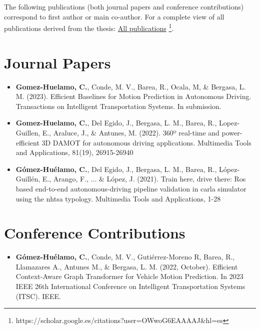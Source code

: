 \begin{refsection}

The following publications (both journal papers and conference contributions) correspond to first author or main co-author. For a complete view of all publications derived from the thesis: \href{https://scholar.google.es/citations?user=OWwoG6EAAAAJ\&hl=es}{All publications} \footnote{https://scholar.google.es/citations?user=OWwoG6EAAAAJ\&hl=es}.

\section*{Journal Papers}

\begin{itemize}

\item \textbf{Gomez-Huelamo, C.}, Conde, M. V., Barea, R., Ocala, M, \& Bergasa, L. M. (2023). Efficient Baselines for Motion Prediction in Autonomous Driving. Transactions on Intelligent Transportation Systems. In submission.

\item \textbf{Gomez-Huelamo, C.}, Del Egido, J., Bergasa, L. M., Barea, R., Lopez-Guillen, E., Araluce, J., \& Antunes, M. (2022). 360º real-time and power-efficient 3D DAMOT for autonomous driving applications. Multimedia Tools and Applications, 81(19), 26915-26940

\item \textbf{Gómez-Huélamo, C.}, Del Egido, J., Bergasa, L. M., Barea, R., López-Guillén, E., Arango, F., ... \& López, J. (2021). Train here, drive there: Ros based end-to-end autonomous-driving pipeline validation in carla simulator using the nhtsa typology. Multimedia Tools and Applications, 1-28

\end{itemize}

\section*{Conference Contributions}

\begin{itemize}

\item \textbf{Gómez-Huélamo, C.}, Conde, M. V., Gutiérrez-Moreno R, Barea, R., Llamazares A., Antunes M., \& Bergasa, L. M. (2022, October). Efficient Context-Aware Graph Transformer for Vehicle Motion Prediction. In 2023 IEEE 26th International Conference on Intelligent Transportation Systems (ITSC). IEEE.


\end{itemize}
\end{refsection}
